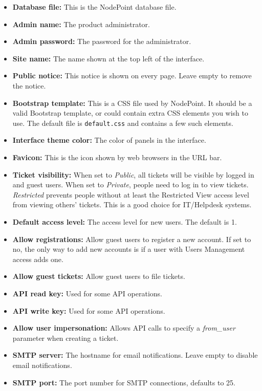 \documentclass[11pt]{article}
\begin{document}
\begin{itemize}
\item \textbf{Database file:} This is the NodePoint database file.
\item \textbf{Admin name:} The product administrator.
\item \textbf{Admin password:} The password for the administrator.
\item \textbf{Site name:} The name shown at the top left of the interface.
\item \textbf{Public notice:} This notice is shown on every page. Leave empty to remove the notice.
\item \textbf{Bootstrap template:} This is a CSS file used by NodePoint. It should be a valid Bootstrap template, or could contain extra CSS elements you wish to use. The default file is \texttt{default.css} and contains a few such elements.
\item \textbf{Interface theme color:} The color of panels in the interface.
\item \textbf{Favicon:} This is the icon shown by web browsers in the URL bar.
\item \textbf{Ticket visibility:} When set to \textit{Public}, all tickets will be visible by logged in and guest users. When set to \textit{Private}, people need to log in to view tickets. \textit{Restricted} prevents people without at least the Restricted View access level from viewing others' tickets. This is a good choice for IT/Helpdesk systems.
\item \textbf{Default access level:} The access level for new users. The default is 1.
\item \textbf{Allow registrations:} Allow guest users to register a new account. If set to no, the only way to add new accounts is if a user with Users Management access adds one.
\item \textbf{Allow guest tickets:} Allow guest users to file tickets.
\item \textbf{API read key:} Used for some API operations.
\item \textbf{API write key:} Used for some API operations.
\item \textbf{Allow user impersonation:} Allows API calls to specify a \textit{from\_user} parameter when creating a ticket.
\item \textbf{SMTP server:} The hostname for email notifications. Leave empty to disable email notifications.
\item \textbf{SMTP port:} The port number for SMTP connections, defaults to 25.

\end{itemize}
\end{document}
